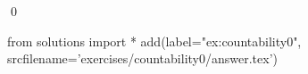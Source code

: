 
\begin{ex} 
  \label{ex:countability0}
  
  \qed
\end{ex} 
\begin{python0}
from solutions import *
add(label="ex:countability0",
    srcfilename='exercises/countability0/answer.tex') 
\end{python0}
